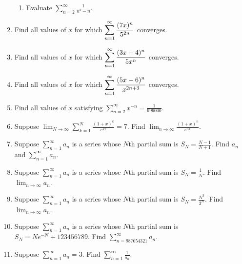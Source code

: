 \documentclass[11pt]{article}
\begin{document}
\begin{enumerate}
\begin{enumerate}
    \item Evaluate $\displaystyle \sum_{n=2}^\infty \frac1{n^3-n}$.

  \end{enumerate}

  \item Find all values of $x$ for which $\displaystyle 
    \sum_{n=1}^\infty {(7x)^n \over 5^{2n}}
  $ converges.

  \item Find all values of $x$ for which $\displaystyle 
    \sum_{n=1}^\infty {(3x + 4)^n \over 5x^n}
  $ converges.

  \item Find all values of $x$ for which $\displaystyle 
    \sum_{n=1}^\infty {(5x - 6)^n \over x^{2n + 3}}
  $ converges.

  \item Find all values of $x$ satisfying $\displaystyle \sum_{n=2}^\infty
  x^{-n} = \frac1{999000}$.

  \item Suppose
  $\displaystyle\lim_{N\to\infty}\sum_{k=1}^N\frac{(1+x)^k}{e^{kx}}=7$. Find
  $\displaystyle\lim_{n\to\infty}\frac{(1+x)^n}{e^{nx}}$.

  \item Suppose $\displaystyle\sum_{n=1}^\infty a_n$ is a series whose $N$th
  partial sum is $\displaystyle S_N=\frac{N-1}{N+1}$. Find
  $a_n$ and $\displaystyle\sum_{n=1}^\infty a_n$.

  \item Suppose $\displaystyle\sum_{n=1}^\infty a_n$ is a series whose $N$th
  partial sum is $\displaystyle S_N=\frac1N$. Find
  $\displaystyle\lim_{n\to\infty}a_n$.

  \item Suppose $\displaystyle\sum_{n=1}^\infty a_n$ is a series whose $N$th
  partial sum is $\displaystyle S_N=\frac{N^3}{3^N}$. Find
  $\displaystyle\lim_{n\to\infty}a_n$.

  \item Suppose $\displaystyle\sum_{n=1}^\infty a_n$ is a series whose $N$th
  partial sum is $\displaystyle S_N=Ne^{-N}+123456789$. Find
  $\displaystyle\sum_{n=987654321}^\infty a_n$.

  \item Suppose $\displaystyle\sum_{n=1}^\infty a_n=3$. Find
  $\displaystyle\sum_{n=1}^\infty\frac1{a_n}$.

\end{enumerate}
\end{document}

